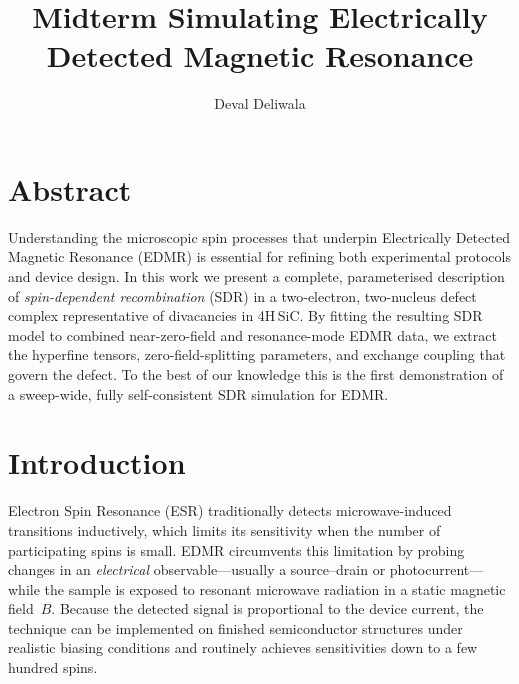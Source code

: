 \documentclass[svgnames]{article}
\title{Midterm \textendash{} Simulating Electrically Detected Magnetic Resonance}
\author{Deval Deliwala}
\begin{document}
\maketitle

\section{Abstract}
Understanding the microscopic spin processes that underpin Electrically Detected Magnetic Resonance (EDMR) is essential for refining both experimental protocols and device design. In this work we present a complete, parameterised description of \emph{spin\hyp{}dependent recombination} (SDR) in a \mbox{two\hyp{}electron}, \mbox{two\hyp{}nucleus} defect complex representative of divacancies in 4H\,\textendash{}SiC. By fitting the resulting SDR model to combined \mbox{near\hyp{}zero\hyp{}field} and \mbox{resonance\hyp{}mode} EDMR data, we extract the hyperfine tensors, \mbox{zero\hyp{}field\hyp{}splitting} parameters, and exchange coupling that govern the defect. To the best of our knowledge this is the first demonstration of a \mbox{sweep\hyp{}wide}, fully \mbox{self\hyp{}consistent} SDR simulation for EDMR.

\section{Introduction}
Electron Spin Resonance (ESR) traditionally detects \mbox{microwave\hyp{}induced} transitions inductively, which limits its sensitivity when the number of participating spins is small. EDMR circumvents this limitation by probing changes in an \emph{electrical} observable—usually a source–drain or photocurrent—while the sample is exposed to resonant microwave radiation in a static magnetic field~$B$. Because the detected signal is proportional to the device current, the technique can be implemented on finished semiconductor structures under realistic biasing conditions and routinely achieves sensitivities down to a few hundred spins.
\end{document}
